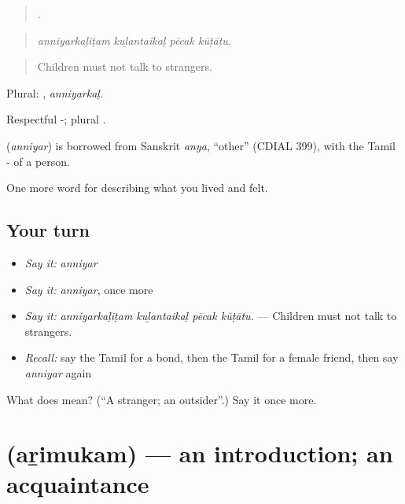 \begin{quote}
   .
\end{quote}

\begin{quote}
\emph{anniyarkaḷiṭam kuḻantaikaḷ pēcak kūṭātu.}
\end{quote}

\begin{quote}
Children must not talk to strangers.
\end{quote}

Plural: , \emph{anniyarkaḷ}.

Respectful -; plural .

\begin{cousinweb}
\textbf{} (\emph{anniyar}) is borrowed from Sanskrit \emph{anya}, \textquotedblleft{}other\textquotedblright{} (CDIAL 399), with the Tamil - of a person.
\end{cousinweb}

\begin{grammarlens}[title={What you've built}]
One more word for describing what you lived and felt.
\end{grammarlens}

\subsection*{Your turn}
\begin{itemize}
\raggedright
  \item \emph{Say it:} \emph{anniyar}
  \item \emph{Say it:} \emph{anniyar}, once more
  \item \emph{Say it:} \emph{anniyarkaḷiṭam kuḻantaikaḷ pēcak kūṭātu.} — Children must not talk to strangers.
  \item \emph{Recall:} say the Tamil for a bond, then the Tamil for a female friend, then say \emph{anniyar} again
\end{itemize}

\begin{tcolorbox}[breakable,colback=teal!4,colframe=teal!35!black,title={Before you move on}]
What does  mean? (\textquotedblleft{}A stranger; an outsider\textquotedblright{}.) Say it once more.
\end{tcolorbox}
\section[\texorpdfstring{\ta{அறிமுகம்} (aṟimukam)}{அறிமுகம் (aṟimukam)}]{ (aṟimukam) — an introduction; an acquaintance}

